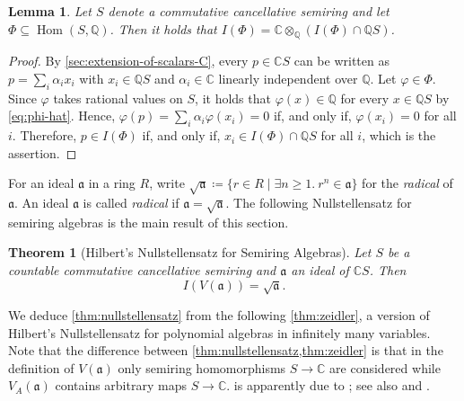 \documentclass[11pt]{scrartcl}
\theoremstyle{definition}
\theoremstyle{plain}
\newtheorem{lemma}[definition]{Lemma}
\newtheorem{theorem}[definition]{Theorem}
\theoremstyle{remark}
\renewcommand\phi\varphi
\DeclareMathOperator\Hom{Hom}
\begin{document}
	\begin{lemma}\label{lem:vanishing-ideal-extended}
		Let $S$ denote a commutative cancellative semiring
		and let $\Phi \subseteq \Hom(S, \mathbb{Q})$.
		Then it holds that
		$I(\Phi) = \mathbb{C} \otimes_{\mathbb{Q}} \left(I(\Phi) \cap \mathbb{Q}S\right)$.
	\end{lemma}
	\begin{proof}
		By \cref{sec:extension-of-scalars-C},
		every $p \in \mathbb{C}S$ can be written as $p = \sum_i \alpha_i x_i$
		with $x_i \in \mathbb{Q}S$
		and $\alpha_i \in \mathbb{C}$ linearly independent over $\mathbb{Q}$.
		Let $\phi \in \Phi$.
		Since $\phi$ takes rational values on $S$,
		it holds that $\phi(x) \in \mathbb{Q}$ for every $x \in \mathbb{Q}S$ by \eqref{eq:phi-hat}.
		Hence, $\phi(p) = \sum_i \alpha_i \phi(x_i) = 0$
		if, and only if, $\phi(x_i) = 0$ for all $i$.
		Therefore, $p \in I(\Phi)$ if, and only if, $x_i \in I(\Phi) \cap \mathbb{Q}S$ for all $i$,
		which is the assertion.
	\end{proof}

	For an ideal $\mathfrak{a}$ in a ring $R$, write $\sqrt{\mathfrak{a}} \coloneqq \{r \in R \mid \exists n \geq 1.\ r^n \in \mathfrak{a}\}$ for the \emph{radical} of $\mathfrak{a}$.
	An ideal $\mathfrak{a}$ is called \emph{radical} if $\mathfrak{a} = \sqrt{\mathfrak{a}}$.
	The following Nullstellensatz for semiring algebras is the main result of this section.


	\begin{theorem}[Hilbert's Nullstellensatz for Semiring Algebras]
		\label{thm:hilbert-nullstellensatz-semiring}\label{thm:nullstellensatz}
		Let $S$ be a countable commutative cancellative semiring and $\mathfrak{a}$ an ideal of $\mathbb{C}S$.
		Then
		\[
			I(V(\mathfrak{a})) = \sqrt{\mathfrak{a}}.
		\]
	\end{theorem}

	We deduce \cref{thm:nullstellensatz} from the following \cref{thm:zeidler},
	a version of Hilbert's Nullstellensatz for polynomial algebras in infinitely many variables.
	Note that the difference between \cref{thm:nullstellensatz,thm:zeidler} is that in the definition of $V(\mathfrak{a})$ only semiring homomorphisms $S \to \mathbb{C}$ are considered while $V_A(\mathfrak{a})$ contains arbitrary maps $S \to \mathbb{C}$.
     is apparently due to \textcite{Lang_1952}; see also \cite[\href{https://stacks.math.columbia.edu/tag/00FU}{Tag 00FU}]{STACKS} and \cite{zeidler_infinite_2026}.
\end{document}
